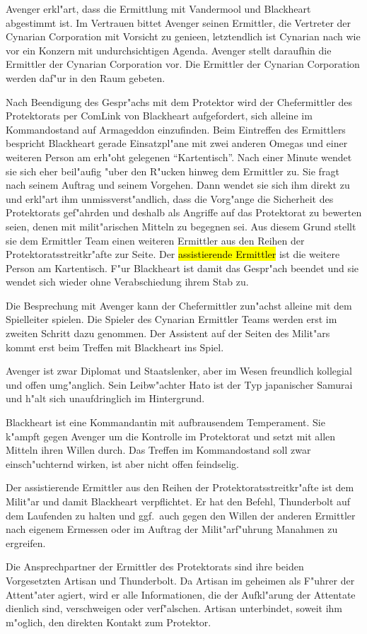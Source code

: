 Avenger erkl"art, dass die Ermittlung mit Vandermool und Blackheart abgestimmt ist. Im Vertrauen bittet Avenger seinen Ermittler, die Vertreter der Cynarian Corporation mit Vorsicht zu genie\3en, letztendlich ist Cynarian nach wie vor ein Konzern mit undurchsichtigen Agenda. Avenger stellt daraufhin die Ermittler der Cynarian Corporation vor. Die Ermittler der Cynarian Corporation werden daf"ur in den Raum gebeten.

Nach Beendigung des Gespr"achs mit dem Protektor wird der Chefermittler des Protektorats per ComLink von Blackheart aufgefordert, sich alleine im Kommandostand auf Armageddon einzufinden. Beim Eintreffen des Ermittlers bespricht Blackheart gerade Einsatzpl"ane mit zwei anderen Omegas und einer weiteren Person am erh"oht gelegenen "`Kartentisch"'. Nach einer Minute wendet sie sich eher beil"aufig "uber den R"ucken hinweg dem Ermittler zu. Sie fragt nach seinem Auftrag und seinem Vorgehen. Dann wendet sie sich ihm direkt zu und erkl"art ihm unmissverst"andlich, dass die Vorg"ange die Sicherheit des Protektorats gef"ahrden und deshalb als Angriffe auf das Protektorat zu bewerten seien, denen mit milit"arischen Mitteln zu begegnen sei. Aus diesem Grund stellt sie dem Ermittler Team einen weiteren Ermittler aus den Reihen der Protektoratsstreitkr"afte zur Seite. Der \hl{assistierende Ermittler} ist die weitere Person am Kartentisch. F"ur Blackheart ist damit das Gespr"ach beendet und sie wendet sich wieder ohne Verabschiedung ihrem Stab zu.
\vfill

\begin{remarks}
	Die Besprechung mit Avenger kann der Chefermittler zun"achst alleine mit dem Spielleiter spielen. Die Spieler des Cynarian Ermittler Teams werden erst im zweiten Schritt dazu genommen. Der Assistent auf der Seiten des Milit"ars kommt erst beim Treffen mit Blackheart ins Spiel.
	
	Avenger ist zwar Diplomat und Staatslenker, aber im Wesen freundlich kollegial und offen umg"anglich. Sein Leibw"achter Hato ist der Typ japanischer Samurai und h"alt sich unaufdringlich im Hintergrund.
	
	Blackheart ist eine Kommandantin mit aufbrausendem Temperament. Sie k"ampft gegen Avenger um die Kontrolle im Protektorat und setzt mit allen Mitteln ihren Willen durch. Das Treffen im Kommandostand soll zwar einsch"uchternd wirken, ist aber nicht offen feindselig.
	
	Der assistierende Ermittler aus den Reihen der Protektoratsstreitkr"afte ist dem Milit"ar und damit Blackheart verpflichtet. Er hat den Befehl, Thunderbolt auf dem Laufenden zu halten und ggf.~auch gegen den Willen der anderen Ermittler nach eigenem Ermessen oder im Auftrag der Milit"arf"uhrung Ma\3nahmen zu ergreifen.

	Die Ansprechpartner der Ermittler des Protektorats sind ihre beiden Vorgesetzten Artisan und Thunderbolt. Da Artisan im geheimen als F"uhrer der Attent"ater agiert, wird er alle Informationen, die der Aufkl"arung der Attentate dienlich sind, verschweigen oder verf"alschen. Artisan unterbindet, soweit ihm m"oglich, den direkten Kontakt zum Protektor.
\end{remarks}

